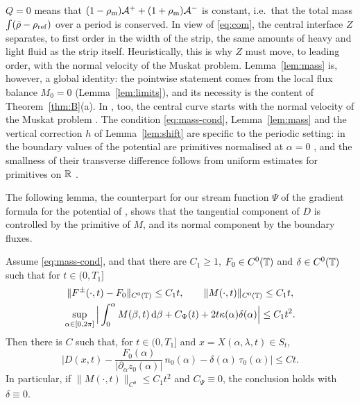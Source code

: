 \begin{remark}\label{rem:centre-of-mass}
$Q=0$ means that $(1-\rho_{\mathrm m})\mathcal A^++(1+\rho_{\mathrm m})\mathcal A^-$ is constant, i.e.\ that the total mass $\int(\bar\rho-\rho_{\rm ref})$ over a period is conserved. In view of \eqref{eq:com},
the central interface $Z$ separates, to first order in the width of the strip, the same amounts of heavy and light fluid as the strip itself. Heuristically, this is why $Z$ must move, to leading
order, with the normal velocity of the Muskat problem. Lemma~\ref{lem:mass} is, however, a global identity: the pointwise statement comes from the local flux balance $M_0=0$
(Lemma~\ref{lem:limits}), and its necessity is the content of Theorem~\ref{thm:B}(a). In \cite{LM26}, too, the central curve starts with the normal velocity of the Muskat problem
\cite[Sec.~3.3.4 and Lemma~5.2]{LM26}. The condition \eqref{eq:mass-cond}, Lemma~\ref{lem:mass} and the vertical correction $h$ of Lemma~\ref{lem:shift} are specific to the periodic setting:
in \cite{LM26} the boundary values of the potential are primitives normalised at $\alpha=0$ \cite[(4.13)]{LM26}, and the smallness of their transverse difference follows from uniform estimates
for primitives on $\mathbb{R}$ \cite[Prop.~7.2 and Lemmas~8.2, 8.6]{LM26}.
\end{remark}

The following lemma, the counterpart for our stream function $\Psi$ of the gradient formula \cite[(4.11)]{LM26} for the potential of \cite{LM26}, shows that the tangential component of
$D$ is controlled by the primitive of $M$, and its normal component by the boundary fluxes.

\begin{lemma}\label{lem:stream}
Assume \eqref{eq:mass-cond}, and that there are $C_1\ge1$, $F_0\in C^0(\mathbb{T})$ and $\delta\in C^0(\mathbb{T})$ such that for $t\in(0,T_1]$
\begin{equation}\label{eq:stream-hyp}
\begin{gathered}
\|F^\pm(\cdot,t)-F_0\|_{C^0(\mathbb{T})}\le C_1t,\qquad \|M(\cdot,t)\|_{C^0(\mathbb{T})}\le C_1t,\\
\sup_{\alpha\in[0,2\pi]}\Big|\int_0^\alpha M(\beta,t)\,\mathrm{d}\beta+C_\Psi(t)+2t\kappa(\alpha)\delta(\alpha)\Big|\le C_1t^2 .
\end{gathered}
\end{equation}
Then there is $C$ such that, for $t\in(0,T_1]$ and $x=X(\alpha,\lambda,t)\in S_t$,
\[
\Big|D(x,t)-\frac{F_0(\alpha)}{|\partial_\alpha z_0(\alpha)|}\,n_0(\alpha)-\delta(\alpha)\,\tau_0(\alpha)\Big|\le Ct .
\]
In particular, if $\|M(\cdot,t)\|_{C^0}\le C_1t^2$ and $C_\Psi\equiv0$, the conclusion holds with $\delta\equiv0$.
\end{lemma}

